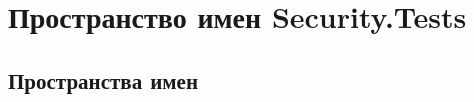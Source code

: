 \hypertarget{namespace_security_1_1_tests}{}\section{Пространство имен Security.\+Tests}
\label{namespace_security_1_1_tests}
\subsection*{Пространства имен}
\begin{DoxyCompactItemize}
\end{DoxyCompactItemize}
